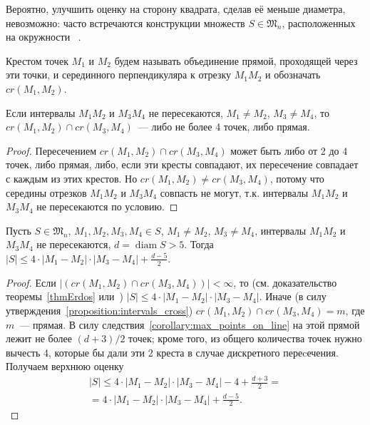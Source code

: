 \begin{remark}
	Вероятно, улучшить оценку на сторону квадрата, сделав её меньше диаметра,
	невозможно: часто встречаются конструкции множеств $S\in\mathfrak{M}_n$, расположенных на окружности
	~\cite{anning1915discussions,harborth1993upper,piepmeyer1996maximum,kurz2008bounds,our-vvmsh-2018}.
\end{remark}

\begin{definition}
	Крестом точек $M_1$ и $M_2$ будем называть объединение прямой,
	проходящей через эти точки,
	и серединного перпендикуляра к отрезку $M_1 M_2$
	и обозначать $cr(M_1,M_2)$.
\end{definition}

\begin{proposition}
	\label{proposition:intervals_cross}
	Если интервалы $M_1 M_2$ и $M_3 M_4$ не пересекаются,
	$M_1 \neq M_2$, $M_3 \neq M_4$,
	то $cr(M_1,M_2) \cap cr(M_3,M_4)$~--- либо не более 4 точек, либо прямая.
\end{proposition}

\begin{proof}
	Пересечением $cr(M_1,M_2) \cap cr(M_3,M_4)$ может быть либо от 2 до 4 точек, либо прямая,
	либо, если эти кресты совпадают, их пересечение совпадает с каждым из этих крестов.
	Но $cr(M_1,M_2) \neq cr(M_3,M_4)$, потому что середины отрезков $M_1 M_2$ и $M_3 M_4$
	совпасть не могут, т.к. интервалы $M_1 M_2$ и $M_3 M_4$ не пересекаются по условию.
\end{proof}

\begin{lemma}
	\label{lemma_preliminary_size}
	Пусть $S\in\mathfrak{M}_n$,
	$M_1, M_2, M_3, M_4 \in S$,
	$M_1 \neq M_2$, $M_3 \neq M_4$,
	интервалы $M_1 M_2$ и $M_3 M_4$ не пересекаются,
	$d = \operatorname{diam} S > 5$.
	Тогда $|S| \leq 4 \cdot |M_1 - M_2| \cdot |M_3 - M_4| + \frac{d-5}{2}$.
\end{lemma}

\begin{proof}
	Если $|(cr(M_1, M_2) \cap cr(M_3, M_4))| < \infty$,
	то (см. доказательство теоремы~\ref{thmErdos} или~\cite[часть 2, неравенство (1)]{solymosi2003note})
	$|S| \leq 4 \cdot |M_1 - M_2| \cdot |M_3 - M_4|$.
	Иначе (в силу утверждения~\ref{proposition:intervals_cross}) $cr(M_1, M_2) \cap cr(M_3, M_4) = m$,
	где $m$~--- прямая.
	В силу следствия~\ref{corollary:max_points_on_line} на этой прямой лежит не более $(d+3)/2$ точек;
	кроме того, из общего количества точек нужно вычесть 4,
	которые бы дали эти 2 креста в случае дискретного переcечения.
	Получаем верхнюю оценку
	\begin{multline}
		|S| \leq 4 \cdot |M_1 - M_2| \cdot |M_3 - M_4| - 4 + \frac{d+3}{2}
		=
		\\=
		4 \cdot |M_1 - M_2| \cdot |M_3 - M_4| + \frac{d-5}{2}
		.
	\end{multline}
\end{proof}

